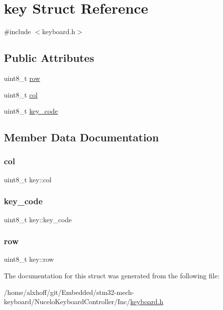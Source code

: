 \hypertarget{structkey}{}\section{key Struct Reference}
\label{structkey}


{\ttfamily \#include $<$keyboard.\+h$>$}

\subsection*{Public Attributes}
\begin{DoxyCompactItemize}
\item 
uint8\+\_\+t \hyperlink{structkey_a7868a52678291b0fd30167d389674d3b}{row}
\item 
uint8\+\_\+t \hyperlink{structkey_a9b24ae59293fde52b58a7a4ced950760}{col}
\item 
uint8\+\_\+t \hyperlink{structkey_ae7eb6f43cdf7c82a0298eb6e17db62be}{key\+\_\+code}
\end{DoxyCompactItemize}


\subsection{Member Data Documentation}
\mbox{\label{structkey_a9b24ae59293fde52b58a7a4ced950760}} 
\subsubsection{\texorpdfstring{col}{col}}
{\footnotesize\ttfamily uint8\+\_\+t key\+::col}

\mbox{\label{structkey_ae7eb6f43cdf7c82a0298eb6e17db62be}} 
\subsubsection{\texorpdfstring{key\+\_\+code}{key\_code}}
{\footnotesize\ttfamily uint8\+\_\+t key\+::key\+\_\+code}

\mbox{\label{structkey_a7868a52678291b0fd30167d389674d3b}} 
\subsubsection{\texorpdfstring{row}{row}}
{\footnotesize\ttfamily uint8\+\_\+t key\+::row}



The documentation for this struct was generated from the following file\+:\begin{DoxyCompactItemize}
\item 
/home/alxhoff/git/\+Embedded/stm32-\/mech-\/keyboard/\+Nucelo\+Keyboard\+Controller/\+Inc/\hyperlink{keyboard_8h}{keyboard.\+h}\end{DoxyCompactItemize}
